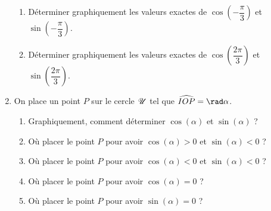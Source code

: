 \documentclass[10pt,openright,twoside,french]{book}
\begin{document}
\begin{enumerate}
    \begin{enumerate}
        \item Déterminer graphiquement les valeurs exactes de $\cos\left(-\dfrac\pi3\right)$ et $\sin\left(-\dfrac\pi3\right)$.
        \item Déterminer graphiquement les valeurs exactes de $\cos\left(\dfrac{2\pi}{3}\right)$ et $\sin\left(\dfrac{2\pi}{3}\right)$.
    \end{enumerate}
    \item On place un point $P$ sur le cercle $\mathscr{U}$ tel que $\widehat{IOP} = \rad\alpha$.
    \begin{enumerate}
        \item Graphiquement, comment déterminer $\cos(\alpha)$ et $\sin(\alpha)$ ?
        \item Où placer le point $P$ pour avoir $\cos(\alpha) > 0$ et $\sin(\alpha) < 0$ ?
        \item Où placer le point $P$ pour avoir $\cos(\alpha) < 0$ et $\sin(\alpha) < 0$ ?
        \item Où placer le point $P$ pour avoir $\cos(\alpha) = 0$ ?
        \item Où placer le point $P$ pour avoir $\sin(\alpha) = 0$ ?
    \end{enumerate}
\end{enumerate}
\end{document}
